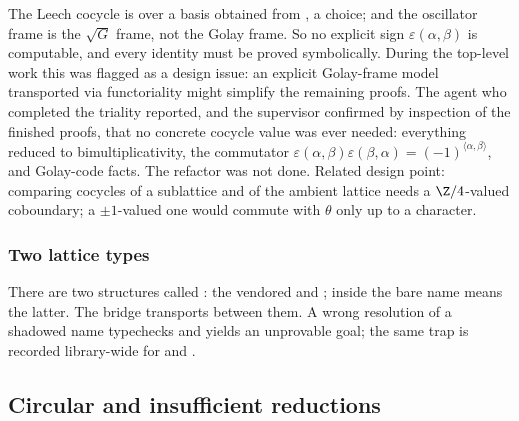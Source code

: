 The Leech cocycle is  over a basis obtained from ,
a choice; and the oscillator frame is the $\sqrt G$ frame, not the Golay frame. So no explicit sign
$\varepsilon(\alpha,\beta)$ is computable, and every identity must be proved symbolically. During the
top-level work this was flagged as a design issue: an explicit Golay-frame model transported via
functoriality might simplify the remaining proofs. The agent who completed the triality reported,
and the supervisor confirmed by inspection of the finished proofs, that no concrete cocycle value
was ever needed: everything reduced to bimultiplicativity, the commutator
$\varepsilon(\alpha,\beta)\varepsilon(\beta,\alpha)=(-1)^{\langle\alpha,\beta\rangle}$, and Golay-code facts.
The refactor was not done. Related design point: comparing cocycles of a sublattice and of the
ambient lattice needs a $\Z/4$-valued coboundary; a $\pm1$-valued one would commute with $\theta$
only up to a character.

\subsubsection{Two lattice types}
There are two structures called : the vendored  and
; inside  the bare name means the latter. The bridge
 transports between them. A wrong resolution of a shadowed name
typechecks and yields an unprovable goal; the same trap is recorded library-wide for
 and .

\subsection{Circular and insufficient reductions}\label{ch15:sec:circ}

